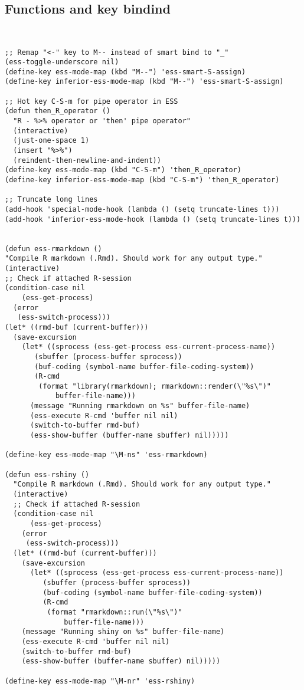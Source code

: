 \documentclass[11pt]{article}
\begin{document}
\subsection{Functions and key bindind}
\label{sec:org938d6f2}
\begin{verbatim}


;; Remap "<-" key to M-- instead of smart bind to "_"
(ess-toggle-underscore nil)
(define-key ess-mode-map (kbd "M--") 'ess-smart-S-assign)
(define-key inferior-ess-mode-map (kbd "M--") 'ess-smart-S-assign)

;; Hot key C-S-m for pipe operator in ESS
(defun then_R_operator ()
  "R - %>% operator or 'then' pipe operator"
  (interactive)
  (just-one-space 1)
  (insert "%>%")
  (reindent-then-newline-and-indent))
(define-key ess-mode-map (kbd "C-S-m") 'then_R_operator)
(define-key inferior-ess-mode-map (kbd "C-S-m") 'then_R_operator)

;; Truncate long lines
(add-hook 'special-mode-hook (lambda () (setq truncate-lines t)))
(add-hook 'inferior-ess-mode-hook (lambda () (setq truncate-lines t)))


(defun ess-rmarkdown ()
"Compile R markdown (.Rmd). Should work for any output type."
(interactive)
;; Check if attached R-session
(condition-case nil
    (ess-get-process)
  (error
   (ess-switch-process)))
(let* ((rmd-buf (current-buffer)))
  (save-excursion
    (let* ((sprocess (ess-get-process ess-current-process-name))
	   (sbuffer (process-buffer sprocess))
	   (buf-coding (symbol-name buffer-file-coding-system))
	   (R-cmd
	    (format "library(rmarkdown); rmarkdown::render(\"%s\")"
		    buffer-file-name)))
      (message "Running rmarkdown on %s" buffer-file-name)
      (ess-execute R-cmd 'buffer nil nil)
      (switch-to-buffer rmd-buf)
      (ess-show-buffer (buffer-name sbuffer) nil)))))

(define-key ess-mode-map "\M-ns" 'ess-rmarkdown)

(defun ess-rshiny ()
  "Compile R markdown (.Rmd). Should work for any output type."
  (interactive)
  ;; Check if attached R-session
  (condition-case nil
      (ess-get-process)
    (error
     (ess-switch-process)))
  (let* ((rmd-buf (current-buffer)))
    (save-excursion
      (let* ((sprocess (ess-get-process ess-current-process-name))
	     (sbuffer (process-buffer sprocess))
	     (buf-coding (symbol-name buffer-file-coding-system))
	     (R-cmd
	      (format "rmarkdown::run(\"%s\")"
		      buffer-file-name)))
	(message "Running shiny on %s" buffer-file-name)
	(ess-execute R-cmd 'buffer nil nil)
	(switch-to-buffer rmd-buf)
	(ess-show-buffer (buffer-name sbuffer) nil)))))

(define-key ess-mode-map "\M-nr" 'ess-rshiny)

\end{verbatim}
\end{document}
